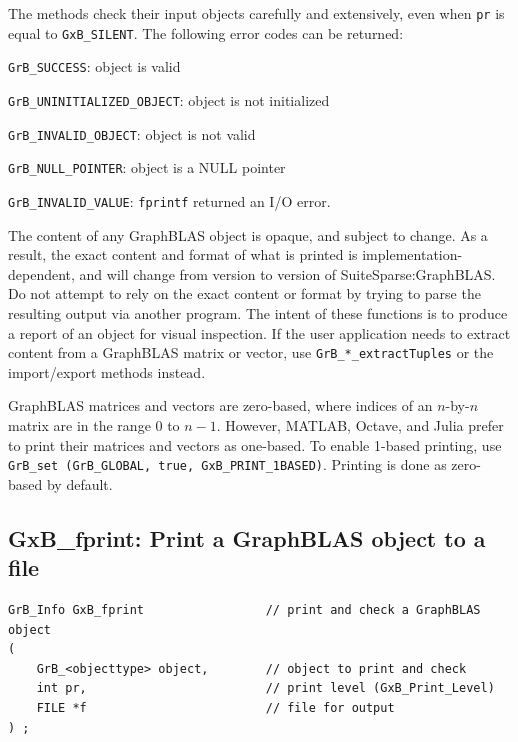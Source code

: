 The methods check their input objects carefully and extensively, even when
\verb'pr' is equal to \verb'GxB_SILENT'.  The following error codes can be
returned:

\begin{packed_itemize}
\item \verb'GrB_SUCCESS':               object is valid
\item \verb'GrB_UNINITIALIZED_OBJECT':  object is not initialized
\item \verb'GrB_INVALID_OBJECT':        object is not valid
\item \verb'GrB_NULL_POINTER':          object is a NULL pointer
\item \verb'GrB_INVALID_VALUE':         \verb'fprintf' returned an I/O error.
\end{packed_itemize}

The content of any GraphBLAS object is opaque, and subject to change.  As a
result, the exact content and format of what is printed is
implementation-dependent, and will change from version to version of
SuiteSparse:GraphBLAS.  Do not attempt to rely on the exact content or format
by trying to parse the resulting output via another program.  The intent of
these functions is to produce a report of an object for visual inspection.  If
the user application needs to extract content from a GraphBLAS matrix or
vector, use \verb'GrB_*_extractTuples' or the import/export methods instead.

GraphBLAS matrices and vectors are zero-based, where indices of an $n$-by-$n$
matrix are in the range 0 to $n-1$.  However, MATLAB, Octave, and Julia prefer
to print their matrices and vectors as one-based.  To enable 1-based printing,
use \verb'GrB_set (GrB_GLOBAL, true, GxB_PRINT_1BASED)'.  Printing is done as
zero-based by default.

\subsection{{\sf GxB\_fprint:} Print a GraphBLAS object to a file} %

\begin{mdframed}[userdefinedwidth=6in]
{\footnotesize
\begin{verbatim}
GrB_Info GxB_fprint                 // print and check a GraphBLAS object
(
    GrB_<objecttype> object,        // object to print and check
    int pr,                         // print level (GxB_Print_Level)
    FILE *f                         // file for output
) ;
\end{verbatim} } \end{mdframed}

